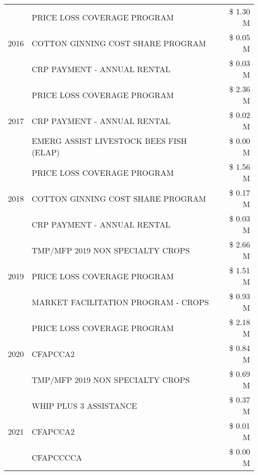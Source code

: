 \begin{tabular}{llr}
\cline{1-3}
\multirow[t]{3}{*}{2016} & PRICE LOSS COVERAGE PROGRAM & \$ 1.30 M \\
 & COTTON GINNING COST SHARE PROGRAM & \$ 0.05 M \\
 & CRP PAYMENT - ANNUAL RENTAL & \$ 0.03 M \\
\cline{1-3}
\multirow[t]{3}{*}{2017} & PRICE LOSS COVERAGE PROGRAM & \$ 2.36 M \\
 & CRP PAYMENT - ANNUAL RENTAL & \$ 0.02 M \\
 & EMERG ASSIST LIVESTOCK BEES FISH (ELAP) & \$ 0.00 M \\
\cline{1-3}
\multirow[t]{3}{*}{2018} & PRICE LOSS COVERAGE PROGRAM & \$ 1.56 M \\
 & COTTON GINNING COST SHARE PROGRAM & \$ 0.17 M \\
 & CRP PAYMENT - ANNUAL RENTAL & \$ 0.03 M \\
\cline{1-3}
\multirow[t]{3}{*}{2019} & TMP/MFP 2019 NON SPECIALTY CROPS & \$ 2.66 M \\
 & PRICE LOSS COVERAGE PROGRAM & \$ 1.51 M \\
 & MARKET FACILITATION PROGRAM - CROPS & \$ 0.93 M \\
\cline{1-3}
\multirow[t]{3}{*}{2020} & PRICE LOSS COVERAGE PROGRAM & \$ 2.18 M \\
 & CFAPCCA2 & \$ 0.84 M \\
 & TMP/MFP 2019 NON SPECIALTY CROPS & \$ 0.69 M \\
\cline{1-3}
\multirow[t]{3}{*}{2021} & WHIP PLUS 3 ASSISTANCE & \$ 0.37 M \\
 & CFAPCCA2 & \$ 0.01 M \\
 & CFAPCCCCA & \$ 0.00 M \\
\cline{1-3}
\bottomrule
\end{tabular}
